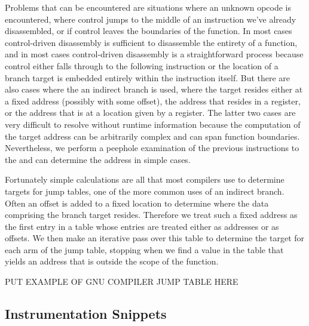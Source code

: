 Problems that can be encountered are situations where an unknown opcode is encountered, where control jumps to the
middle of an instruction we've already disassembled, or if control leaves the boundaries of the function. In most
cases control-driven disassembly is sufficient to disassemble the entirety of a function, and in most cases control-driven
disassembly is a straightforward process because control either falls through to the following instruction 
or the location of a branch target is embedded entirely within the instruction itself. But there are also cases
where the an indirect branch is used, where the target resides either at a fixed address (possibly with some offset), the address that resides in a register,
or the address that is at a location given by a register. The latter two cases are very difficult to resolve
without runtime information because the computation of the target address can be arbitrarily complex and can span function
boundaries. Nevertheless, we perform a peephole examination of the previous instructions to the and can determine 
the address in simple cases.

Fortunately simple calculations are all that most compilers use to determine targets for jump tables, one of the more common
uses of an indirect branch. Often an offset is added to a fixed location to determine where the data comprising the branch target
resides. Therefore we treat such a fixed address as the first entry in a table whose entries are treated either as addresses or as offsets.
We then make an iterative pass over this table to determine the target for each arm of the jump table, stopping when we find a value in the
table that yields an address that is outside the scope of the function.

PUT EXAMPLE OF GNU COMPILER JUMP TABLE HERE

\subsection{Instrumentation Snippets}
